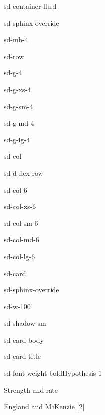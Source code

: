 \documentclass[letterpaper,10pt,english]{jupyterBook}
\let\sphinxpxdimen\pdfpxdimen\else\newdimen\sphinxpxdimen
\begin{document}
\begin{sphinxuseclass}{sd-container-fluid}
\begin{sphinxuseclass}{sd-sphinx-override}
\begin{sphinxuseclass}{sd-mb-4}
\begin{sphinxuseclass}{sd-row}
\begin{sphinxuseclass}{sd-g-4}
\begin{sphinxuseclass}{sd-g-xs-4}
\begin{sphinxuseclass}{sd-g-sm-4}
\begin{sphinxuseclass}{sd-g-md-4}
\begin{sphinxuseclass}{sd-g-lg-4}
\begin{sphinxuseclass}{sd-col}
\begin{sphinxuseclass}{sd-d-flex-row}
\begin{sphinxuseclass}{sd-col-6}
\begin{sphinxuseclass}{sd-col-xs-6}
\begin{sphinxuseclass}{sd-col-sm-6}
\begin{sphinxuseclass}{sd-col-md-6}
\begin{sphinxuseclass}{sd-col-lg-6}
\begin{sphinxuseclass}{sd-card}
\begin{sphinxuseclass}{sd-sphinx-override}
\begin{sphinxuseclass}{sd-w-100}
\begin{sphinxuseclass}{sd-shadow-sm}
\begin{sphinxuseclass}{sd-card-body}
\begin{sphinxuseclass}{sd-card-title}
\begin{sphinxuseclass}{sd-font-weight-bold}Hypothesis 1
\end{sphinxuseclass}
\end{sphinxuseclass}
\sphinxAtStartPar
Strength and rate

\noindent{\hspace*{\fill}\sphinxincludegraphics[width=200\sphinxpxdimen]{{england-mckenzie}.png}\hspace*{\fill}}

\sphinxAtStartPar
England and McKenzie {[}\hyperlink{cite.references:id6}{2}{]}


\end{sphinxuseclass}
\end{sphinxuseclass}
\end{sphinxuseclass}
\end{sphinxuseclass}
\end{sphinxuseclass}
\end{sphinxuseclass}
\end{sphinxuseclass}
\end{sphinxuseclass}
\end{sphinxuseclass}
\end{sphinxuseclass}
\end{sphinxuseclass}
\end{sphinxuseclass}
\end{sphinxuseclass}
\end{sphinxuseclass}
\end{sphinxuseclass}
\end{sphinxuseclass}
\end{sphinxuseclass}
\end{sphinxuseclass}
\end{sphinxuseclass}
\end{sphinxuseclass}
\end{sphinxuseclass}
\end{document}
